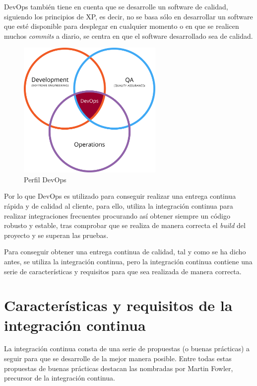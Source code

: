 \ac{DevOps} también tiene en cuenta que se desarrolle un software de calidad, siguiendo los principios de \ac{XP}, es decir, no se basa sólo en desarrollar un software que esté disponible para desplegar en cualquier momento o en que se realicen muchos \textit{commits} a diario, se centra en que el software desarrollado sea de calidad.

\begin{figure}[!h]
\centering
   \includegraphics[width=7cm]{Partes_DevOps.png}
\caption{Perfil \ac{DevOps}}
\end{figure}

Por lo que \ac{DevOps} es utilizado para conseguir realizar una entrega continua rápida y de calidad al cliente, para ello, utiliza la integración continua para realizar integraciones frecuentes procurando así obtener siempre un código robusto y estable, tras comprobar que se realiza de manera correcta el \textit{build} del proyecto y se superan las pruebas.

Para conseguir obtener una entrega continua de calidad, tal y como se ha dicho antes, se utiliza la integración continua, pero la integración continua contiene una serie de características y requisitos para que sea realizada de manera correcta.

\section{Características y requisitos de la integración continua}

La integración continua consta de una serie de propuestas (o buenas prácticas) a seguir para que se desarrolle de la mejor manera posible. Entre todas estas propuestas de buenas prácticas destacan las nombradas por Martin Fowler\cite{IC}, precursor de la integración continua.

\clearpage

